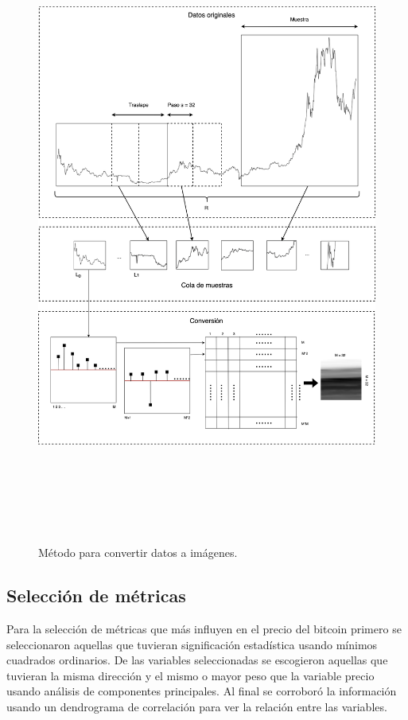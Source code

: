 \begin{figure}[h!]
	\includegraphics[width=\textwidth,height=21cm]{Chapter3/3-2.png}
	\caption{Método para convertir datos a imágenes.}
	\label{fig: met5}
\end{figure}

\subsection{Selección de métricas}
\label{ssec:metrics}
Para la selección de métricas que más influyen en el precio del bitcoin primero se seleccionaron aquellas que tuvieran significación estadística usando mínimos cuadrados ordinarios. De las variables seleccionadas se escogieron aquellas que tuvieran la misma dirección y el mismo o mayor peso que la variable precio usando análisis de componentes principales. Al final se corroboró la información usando un dendrograma de correlación para ver la relación entre las variables.

